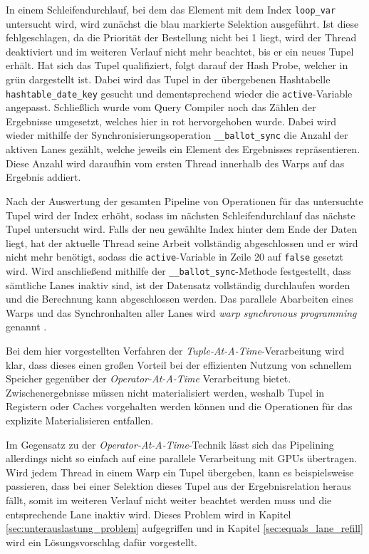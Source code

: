 In einem Schleifendurchlauf, bei dem das Element mit dem Index \texttt{loop\_var} untersucht wird, wird zunächst die blau markierte Selektion ausgeführt.
Ist diese fehlgeschlagen, da die Priorität der Bestellung nicht bei 1 liegt, wird der Thread deaktiviert und im weiteren Verlauf nicht mehr beachtet, bis er ein neues Tupel erhält.
Hat sich das Tupel qualifiziert, folgt darauf der Hash Probe, welcher in grün dargestellt ist.
Dabei wird das Tupel in der übergebenen Hashtabelle \texttt{hashtable\_date\_key} gesucht und dementsprechend wieder die \texttt{active}-Variable angepasst.
Schließlich wurde vom Query Compiler noch das Zählen der Ergebnisse umgesetzt, welches hier in rot hervorgehoben wurde.
Dabei wird wieder mithilfe der Synchronisierungsoperation \texttt{\_\_ballot\_sync} die Anzahl der aktiven Lanes gezählt, welche jeweils ein Element des Ergebnisses repräsentieren.
Diese Anzahl wird daraufhin vom ersten Thread innerhalb des Warps auf das Ergebnis addiert. 

Nach der Auswertung der gesamten Pipeline von Operationen für das untersuchte Tupel wird der Index erhöht, sodass im nächsten Schleifendurchlauf das nächste Tupel untersucht wird.
Falls der neu gewählte Index hinter dem Ende der Daten liegt, hat der aktuelle Thread seine Arbeit vollständig abgeschlossen und er wird nicht mehr benötigt, sodass die \texttt{active}-Variable in Zeile 20 auf \texttt{false} gesetzt wird.
Wird anschließend mithilfe der \texttt{\_\_ballot\_sync}-Methode festgestellt, dass sämtliche Lanes inaktiv sind, ist der Datensatz vollständig durchlaufen worden und die Berechnung kann abgeschlossen werden.
Das parallele Abarbeiten eines Warps und das Synchronhalten aller Lanes wird \emph{warp synchronous programming} genannt \cite{Lin2018}.

Bei dem hier vorgestellten Verfahren der \emph{Tuple-At-A-Time}-Verarbeitung wird klar, dass dieses einen großen Vorteil bei der effizienten Nutzung von schnellem Speicher gegenüber der \emph{Operator-At-A-Time} Verarbeitung bietet.
Zwischenergebnisse müssen nicht materialisiert werden, weshalb Tupel in Registern oder Caches vorgehalten werden können und die Operationen für das explizite Materialisieren entfallen.

Im Gegensatz zu der \emph{Operator-At-A-Time}-Technik lässt sich das Pipelining allerdings nicht so einfach auf eine parallele Verarbeitung mit GPUs übertragen.
Wird jedem Thread in einem Warp ein Tupel übergeben, kann es beispielsweise passieren, dass bei einer Selektion dieses Tupel aus der Ergebnisrelation heraus fällt, somit im weiteren Verlauf nicht weiter beachtet werden muss und die entsprechende Lane inaktiv wird.
Dieses Problem wird in Kapitel \ref{sec:unterauslastung_problem} aufgegriffen und in Kapitel \ref{sec:equals_lane_refill} wird ein Lösungsvorschlag dafür vorgestellt.